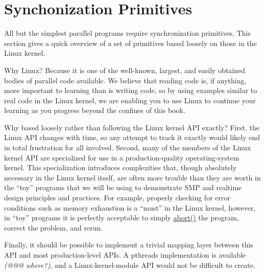 
\section{Synchonization Primitives}
\label{sec:intro:Synchonization Primitives}

All but the simplest parallel programs require synchronization
primitives.
This section gives a quick overview of a set of primitives based
loosely on those in the Linux kernel.

Why Linux?
Because it is one of the well-known, largest, and easily obtained
bodies of parallel code available.
We believe that reading code is, if anything, more important to learning 
than is writing code, so by using examples similar to real code in
the Linux kernel, we are enabling you to use Linux to continue your
learning as you progress beyond the confines of this book.

Why based loosely rather than following the Linux kernel API exactly?
First, the Linux API changes with time, so any attempt to track it
exactly would likely end in total frustration for all involved.
Second, many of the members of the Linux kernel API are specialized for
use in a production-quality operating-system kernel.
This specialization introduces complexities that, though absolutely
necessary in the Linux kernel itself, are often more trouble than they are
worth in the ``toy'' programs that we will be using to demonstrate
SMP and realtime design principles and practices.
For example, properly checking for error conditions such as memory
exhaustion is a ``must'' in the Linux kernel, however, in ``toy'' programs
it is perfectly acceptable to simply \url{abort()} the program,
correct the problem, and rerun.

Finally, it should be possible to implement a trivial mapping layer between
this API and most production-level APIs.
A pthreads implementation is available \emph{(@@@ where?)}, and
a Linux-kernel-module API would not be difficult to create.

\QuickQuizEnd

